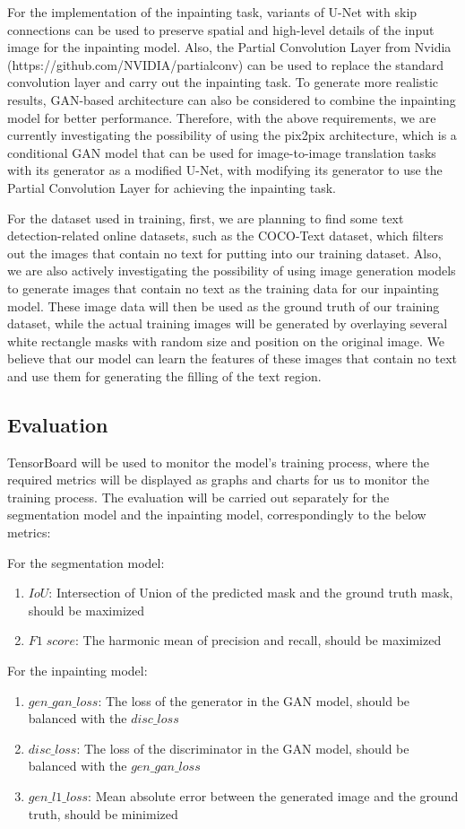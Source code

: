 \documentclass[10pt,twocolumn,letterpaper]{article}
\begin{document}
For the implementation of the inpainting task, variants of U-Net with skip connections can be used to preserve spatial and high-level 
details of the input image for the inpainting model. Also, the Partial Convolution Layer from Nvidia 
(https://github.com/NVIDIA/partialconv) can be used to replace the standard convolution layer and carry out the inpainting task. To 
generate more realistic results, GAN-based architecture can also be considered to combine the inpainting model for better performance.
Therefore, with the above requirements, we are currently investigating the possibility of using the pix2pix architecture,
which is a conditional GAN model that can be used for image-to-image translation tasks with its generator as a modified U-Net, 
with modifying its generator to use the Partial Convolution Layer for achieving the inpainting task.

For the dataset used in training, first, we are planning to find some text detection-related online datasets, 
such as the COCO-Text dataset, which filters out the images that contain no text for putting into our training dataset. 
Also, we are also actively investigating the possibility of using image generation models to generate images that contain 
no text as the training data for our inpainting model. These image data will then be used as the ground truth of our training dataset, 
while the actual training images will be generated by overlaying several white rectangle masks with random size and position on the original image. 
We believe that our model can learn the features of these images that contain no text and use them for generating the filling of the text region.

\subsection{Evaluation}

TensorBoard will be used to monitor the model's training process, where the required metrics will be displayed as graphs and charts 
for us to monitor the training process. The evaluation will be carried out separately for the segmentation model and the inpainting 
model, correspondingly to the below metrics:

For the segmentation model:
\begin{enumerate}
    \item $IoU$: Intersection of Union of the predicted mask and the ground truth mask, should be maximized
    \item $F1\;score$: The harmonic mean of precision and recall, should be maximized
\end{enumerate}

For the inpainting model:
\begin{enumerate}
    \item $gen\_gan\_loss$: The loss of the generator in the GAN model, should be balanced with the $disc\_loss$
    \item $disc\_loss$: The loss of the discriminator in the GAN model, should be balanced with the $gen\_gan\_loss$
    \item $gen\_l1\_loss$: Mean absolute error between the generated image and the ground truth, should be minimized
\end{enumerate}
\end{document}
